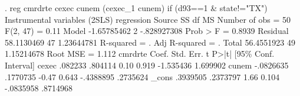 . reg cmrdrte cexec cunem (cexec_1 cunem) if (d93==1 \& state!="TX")
{\smallskip}
Instrumental variables (2SLS) regression
{\smallskip}
      Source {\VBAR}       SS           df       MS      Number of obs   =        50
   F(2, 47)        =      0.11
       Model {\VBAR} -1.65785462         2 -.828927308   Prob > F        =    0.8939
    Residual {\VBAR}  58.1130469        47  1.23644781   R-squared       =         .
   Adj R-squared   =         .
       Total {\VBAR}  56.4551923        49  1.15214678   Root MSE        =     1.112
{\smallskip}
     cmrdrte {\VBAR}      Coef.   Std. Err.      t    P>|t|     [95\% Conf. Interval]
       cexec {\VBAR}    .082233    .804114     0.10   0.919    -1.535436    1.699902
       cunem {\VBAR}  -.0826635   .1770735    -0.47   0.643    -.4388895    .2735624
       _cons {\VBAR}   .3939505   .2373797     1.66   0.104    -.0835958    .8714968
{\smallskip}
